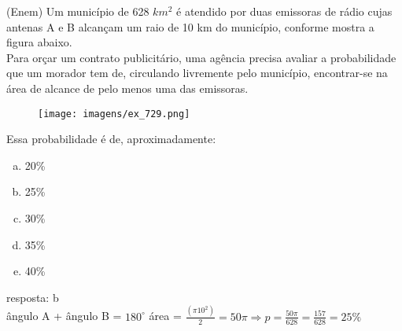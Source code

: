 \begin{ex}
(Enem) Um município de 628 $km^2$ é atendido por duas emissoras de rádio cujas antenas A e B alcançam um raio de 10 km do município, conforme mostra a figura abaixo.\\
Para orçar um contrato publicitário, uma agência precisa avaliar a probabilidade que um morador tem de, circulando livremente pelo município, encontrar-se na área de alcance de pelo menos uma das emissoras.
   \begin{figure} [!htb]
       \centering
       \texttt{[image: imagens/ex\_729.png]}
   \end{figure}
Essa probabilidade é de, aproximadamente:
   \begin{enumerate}[(a)]
   \item 20\%
   \item 25\%
   \item 30\%
   \item 35\%
   \item 40\%
   \end{enumerate}
    \begin{sol}
     resposta: b \\
    ângulo A + ângulo B = $180^{\circ}$ \hspace{0,6 cm} área = $\frac{(\pi {10}^2)}{2}=50\pi \Longrightarrow p=\frac{50\pi}{628}=\frac{157}{628}=25\%$
    \end{sol}
\end{ex}
